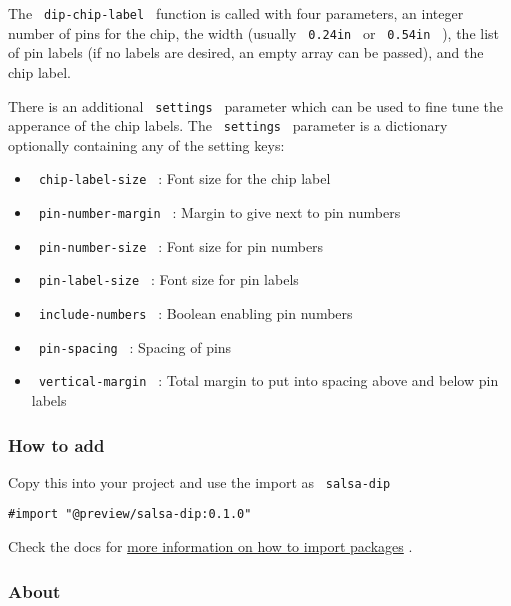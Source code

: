 The \texttt{\ dip-chip-label\ } function is called with four parameters,
an integer number of pins for the chip, the width (usually
\texttt{\ 0.24in\ } or \texttt{\ 0.54in\ } ), the list of pin labels (if
no labels are desired, an empty array can be passed), and the chip
label.

There is an additional \texttt{\ settings\ } parameter which can be used
to fine tune the apperance of the chip labels. The \texttt{\ settings\ }
parameter is a dictionary optionally containing any of the setting keys:

\begin{itemize}
\tightlist
\item
  \texttt{\ chip-label-size\ } : Font size for the chip label
\item
  \texttt{\ pin-number-margin\ } : Margin to give next to pin numbers
\item
  \texttt{\ pin-number-size\ } : Font size for pin numbers
\item
  \texttt{\ pin-label-size\ } : Font size for pin labels
\item
  \texttt{\ include-numbers\ } : Boolean enabling pin numbers
\item
  \texttt{\ pin-spacing\ } : Spacing of pins
\item
  \texttt{\ vertical-margin\ } : Total margin to put into spacing above
  and below pin labels
\end{itemize}

\subsubsection{How to add}\label{how-to-add}

Copy this into your project and use the import as \texttt{\ salsa-dip\ }

\begin{verbatim}
#import "@preview/salsa-dip:0.1.0"
\end{verbatim}



Check the docs for
\href{https://typst.app/docs/reference/scripting/\#packages}{more
information on how to import packages} .

\subsubsection{About}\label{about}

